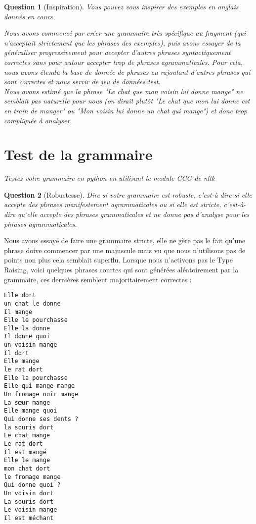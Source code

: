 \documentclass[12pt]{article}
\theoremstyle{exostyle}
\newtheorem{exo}{Question}[section]
\begin{document}
\begin{exo}[Inspiration]
\textit{Vous pouvez vous inspirer des exemples en anglais donnés en cours}

Nous avons commencé par créer une grammaire très spécifique au fragment (qui n'acceptait strictement que les phrases des exemples), puis avons essayer de la généraliser progressivement pour accepter d'autres phrases syntactiquement correctes sans pour autour accepter trop de phrases agrammaticales. Pour cela, nous avons étendu la base de donnée de phrases en rajoutant d'autres phrases qui sont correctes et nous servir de jeu de données test.\\
Nous avons estimé que la phrase "Le chat que mon voisin lui donne mange" ne semblait pas naturelle pour nous (on dirait plutôt "Le chat que mon lui donne est en train de manger" ou "Mon voisin lui donne un chat qui mange") et donc trop compliquée à analyser.
\end{exo}

\section{Test de la grammaire}
\textit{Testez votre grammaire en python en utilisant le module CCG de nltk}

\begin{exo}[Robustesse]
\textit{Dire si votre grammaire est robuste, c’est-à dire si elle accepte des phrases
manifestement agrammaticales ou si elle est stricte, c’est-à-dire qu’elle accepte
des phrases grammaticales et ne donne pas d’analyse pour les phrases
agrammaticales.}
\end{exo}
Nous avons essayé de faire une grammaire stricte, elle ne gère pas le fait qu'une phrase doive commencer par une majuscule mais vu que nous n'utilisons pas de points non plus cela semblait superflu. Lorsque nous n'activons pas le Type Raising, voici quelques phrases courtes qui sont générées aléatoirement par la grammaire, ces dernières semblent majoritairement correctes :

\begin{verbatim}
Elle dort
un chat le donne
Il mange
Elle le pourchasse
Elle la donne
Il donne quoi
un voisin mange
Il dort
Elle mange
le rat dort
Elle la pourchasse
Elle qui mange mange
Un fromage noir mange
La sœur mange
Elle mange quoi
Qui donne ses dents ?
la souris dort
Le chat mange
Le rat dort
Il est mangé
Elle le mange
mon chat dort
le fromage mange
Qui donne quoi ?
Un voisin dort
La souris dort
Le voisin mange
Il est méchant
\end{verbatim}
\end{document}
